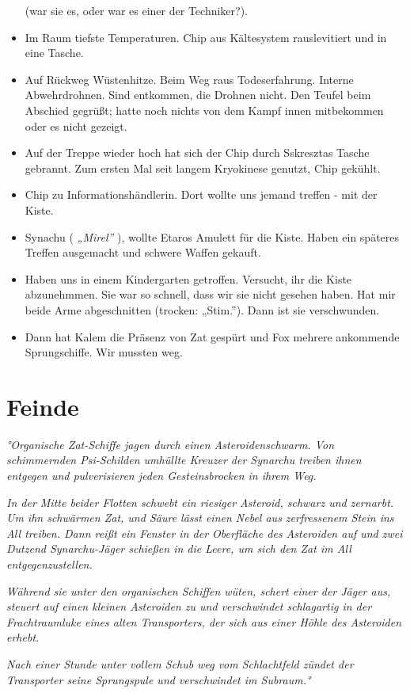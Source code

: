 \documentclass[11pt]{scrartcl}
\begin{document}
\begin{itemize}
  (war sie es, oder war es einer der Techniker?).
\item
  Im Raum tiefste Temperaturen. Chip aus Kältesystem rauslevitiert und
  in eine Tasche.
\item
  Auf Rückweg Wüstenhitze. Beim Weg raus Todeserfahrung. Interne
  Abwehrdrohnen. Sind entkommen, die Drohnen nicht. Den Teufel beim
  Abschied gegrüßt; hatte noch nichts von dem Kampf innen mitbekommen
  oder es nicht gezeigt.
\item
  Auf der Treppe wieder hoch hat sich der Chip durch Sskresztas Tasche
  gebrannt. Zum ersten Mal seit langem Kryokinese genutzt, Chip gekühlt.
\item
  Chip zu Informationshändlerin. Dort wollte uns jemand treffen - mit
  der Kiste.
\item
  Synachu ( \emph{„Mirel''} ), wollte Etaros Amulett für die Kiste.
  Haben ein späteres Treffen ausgemacht und schwere Waffen gekauft.
\item
  Haben uns in einem Kindergarten getroffen. Versucht, ihr die Kiste
  abzunehmmen. Sie war so schnell, dass wir sie nicht gesehen haben. Hat
  mir beide Arme abgeschnitten (trocken: „Stim.''). Dann ist sie
  verschwunden.
\item
  Dann hat Kalem die Präsenz von Zat gespürt und Fox mehrere ankommende
  Sprungschiffe. Wir mussten weg.
\end{itemize}
\section{Feinde}

\emph{°Organische Zat-Schiffe jagen durch einen Asteroidenschwarm. Von
schimmernden Psi-Schilden umhüllte Kreuzer der Synarchu treiben ihnen
entgegen und pulverisieren jeden Gesteinsbrocken in ihrem Weg.}

\emph{In der Mitte beider Flotten schwebt ein riesiger Asteroid, schwarz
und zernarbt. Um ihn schwärmen Zat, und Säure lässt einen Nebel aus
zerfressenem Stein ins All treiben. Dann reißt ein Fenster in der
Oberfläche des Asteroiden auf und zwei Dutzend Synarchu-Jäger schießen
in die Leere, um sich den Zat im All entgegenzustellen.}

\emph{Während sie unter den organischen Schiffen wüten, schert einer der
Jäger aus, steuert auf einen kleinen Asteroiden zu und verschwindet
schlagartig in der Frachtraumluke eines alten Transporters, der sich aus
einer Höhle des Asteroiden erhebt.}

\emph{Nach einer Stunde unter vollem Schub weg vom Schlachtfeld zündet
der Transporter seine Sprungspule und verschwindet im Subraum.°}
\end{document}

